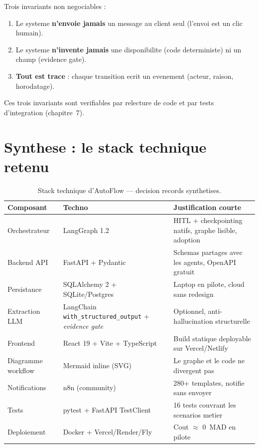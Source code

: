\documentclass[12pt,a4paper,openany]{report}
\begin{document}
\begin{mechanismbox}
Trois invariants non negociables :
\begin{enumerate}
\item Le systeme \textbf{n'envoie jamais} un message au client seul (l'envoi est un clic humain).
\item Le systeme \textbf{n'invente jamais} une disponibilite (code deterministe) ni un champ (evidence gate).
\item \textbf{Tout est trace} : chaque transition ecrit un evenement (acteur, raison, horodatage).
\end{enumerate}
Ces trois invariants sont verifiables par relecture de code et par tests d'integration (chapitre~7).
\end{mechanismbox}

\section{Synthese : le stack technique retenu}

\begin{table}[H]\centering\small
\caption{Stack technique d'AutoFlow --- decision records synthetises.}
\label{tab:stack}
\begin{tabularx}{\textwidth}{l l X}\toprule
\rowcolor{emsiGreen!30}\textbf{Composant} & \textbf{Techno} & \textbf{Justification courte}\\\midrule
Orchestrateur        & LangGraph 1.2                 & HITL + checkpointing natifs, graphe lisible, adoption\\
Backend API          & FastAPI + Pydantic            & Schemas partages avec les agents, OpenAPI gratuit\\
Persistance          & SQLAlchemy 2 + SQLite/Postgres & Laptop en pilote, cloud sans redesign\\
Extraction LLM       & LangChain \texttt{with\_structured\_output} + \emph{evidence gate} & Optionnel, anti-hallucination structurelle\\
Frontend             & React 19 + Vite + TypeScript  & Build statique deployable sur Vercel/Netlify\\
Diagramme workflow   & Mermaid inline (SVG)          & Le graphe et le code ne divergent pas\\
Notifications        & n8n (community)               & 280+ templates, notifie sans envoyer\\
Tests                & pytest + FastAPI TestClient   & 16 tests couvrant les scenarios metier\\
Deploiement          & Docker + Vercel/Render/Fly    & Cout $\approx$ 0~MAD en pilote\\
\bottomrule
\end{tabularx}
\end{table}
\end{document}
